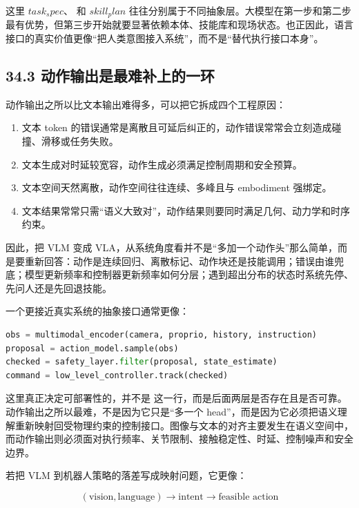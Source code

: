 这里 \(task_spec\)、\texttt{} 和 \(skill_plan\) 往往分别属于不同抽象层。大模型在第一步和第二步最有优势，但第三步开始就要显著依赖本体、技能库和现场状态。也正因此，语言接口的真实价值更像“把人类意图接入系统”，而不是“替代执行接口本身”。

\subsection*{34.3 动作输出是最难补上的一环}


动作输出之所以比文本输出难得多，可以把它拆成四个工程原因：

\begin{enumerate}
\item 文本 token 的错误通常是离散且可延后纠正的，动作错误常常会立刻造成碰撞、滑移或任务失败。
\item 文本生成对时延较宽容，动作生成必须满足控制周期和安全预算。
\item 文本空间天然离散，动作空间往往连续、多峰且与 embodiment 强绑定。
\item 文本结果常常只需“语义大致对”，动作结果则要同时满足几何、动力学和时序约束。
\end{enumerate}

因此，把 VLM 变成 VLA，从系统角度看并不是“多加一个动作头”那么简单，而是要重新回答：动作是连续回归、离散标记、动作块还是技能调用；错误由谁兜底；模型更新频率和控制器更新频率如何分层；遇到超出分布的状态时系统先停、先问人还是先回退技能。

一个更接近真实系统的抽象接口通常更像：

\begin{lstlisting}[language=python]
obs = multimodal_encoder(camera, proprio, history, instruction)
proposal = action_model.sample(obs)
checked = safety_layer.filter(proposal, state_estimate)
command = low_level_controller.track(checked)
\end{lstlisting}

这里真正决定可部署性的，并不是 \texttt{} 这一行，而是后面两层是否存在且是否可靠。 动作输出之所以最难，不是因为它只是“多一个 head”，而是因为它必须把语义理解重新映射回受物理约束的控制接口。图像与文本的对齐主要发生在语义空间中，而动作输出则必须面对执行频率、关节限制、接触稳定性、时延、控制噪声和安全边界。

若把 VLM 到机器人策略的落差写成映射问题，它更像：

\begingroup
\scriptsize
\begin{equation*}
(\text{vision}, \text{language}) \rightarrow \text{intent} \rightarrow \text{feasible action}
\end{equation*}
\endgroup

